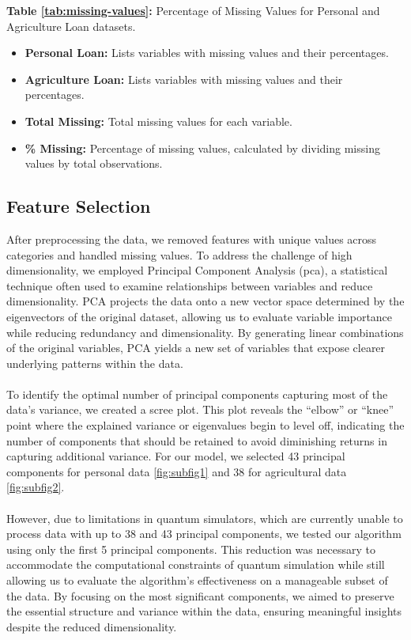 \documentclass[a4paper]{article}
\begin{document}
\begin{table}[H]
\begin{flushleft}
	\textbf{Table \ref{tab:missing-values}:} Percentage of Missing Values for Personal and Agriculture Loan datasets.
	\begin{itemize}
		\item \textbf{Personal Loan:} Lists variables with missing values and their percentages.
		\item \textbf{Agriculture Loan:} Lists variables with missing values and their percentages.
		\item \textbf{Total Missing:} Total missing values for each variable.
		\item \textbf{\% Missing:} Percentage of missing values, calculated by dividing missing values by total observations.
	\end{itemize}
\end{flushleft}

\end{table}

\subsection{Feature Selection}
After preprocessing the data, we removed features with unique values across categories and handled missing values. To address the challenge of high dimensionality, we employed Principal Component Analysis (\gls{pca})\cite{Chen2016}, a statistical technique often used to examine relationships between variables and reduce dimensionality. PCA projects the data onto a new vector space determined by the eigenvectors of the original dataset, allowing us to evaluate variable importance while reducing redundancy and dimensionality. By generating linear combinations of the original variables, PCA yields a new set of variables that expose clearer underlying patterns within the data. \\\\ To identify the optimal number of principal components capturing most of the data’s variance, we created a scree plot. This plot reveals the “elbow” or “knee” point where the explained variance or eigenvalues begin to level off, indicating the number of components that should be retained to avoid diminishing returns in capturing additional variance. For our model, we selected 43 principal components for personal data \ref{fig:subfig1} and 38 for agricultural data \ref{fig:subfig2}. \\\\ However, due to limitations in quantum simulators, which are currently unable to process data with up to 38 and 43 principal components, we tested our algorithm using only the first 5 principal components. This reduction was necessary to accommodate the computational constraints of quantum simulation while still allowing us to evaluate the algorithm’s effectiveness on a manageable subset of the data. By focusing on the most significant components, we aimed to preserve the essential structure and variance within the data, ensuring meaningful insights despite the reduced dimensionality.
\end{document}
